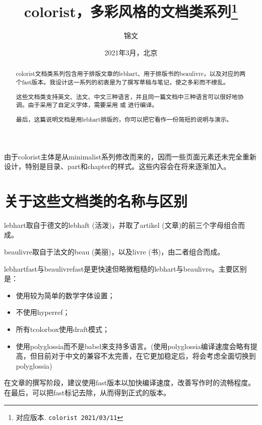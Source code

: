 \documentclass{lebhart}
\providecommand{\colorist}{\textsf{colorist}}
\providecommand{\lebhart}{\textsf{lebhart}}
\providecommand{\lebhartfast}{\textsf{lebhartfast}}
\providecommand{\beaulivre}{\textsf{beaulivre}}
\providecommand{\beaulivrefast}{\textsf{beaulivrefast}}
\begin{document}
\title{\colorist{}，多彩风格的文档类系列\thanks{对应版本. \texttt{\colorist{} 2021/03/11}}}
\author{锦文}
\date{2021年3月，北京}

\maketitle

\begin{abstract}
    \colorist{}文档类系列包含用于排版文章的\lebhart{}、用于排版书的\beaulivre{}，以及对应的两个fast版本。我设计这一系列的初衷是为了撰写草稿与笔记，使之多彩而不缭乱。

    这些文档类支持英文、法文、中文三种语言，并且同一篇文档中三种语言可以很好地协调。由于采用了自定义字体，需要采用  或  进行编译。
    
    最后，这篇说明文档是用\lebhart{}排版的，你可以把它看作一份简短的说明与演示。
\end{abstract}

\begin{tcolorbox}[enhanced jigsaw,pad at break*=1mm,breakable,colback=yellow!25!paper,boxrule=0pt,frame hidden]
    由于\colorist{}主体是从\textsf{minimalist}系列修改而来的，因而一些页面元素还未完全重新设计，特别是目录、part和chapter的样式。这些内容会在将来逐渐加入。
\end{tcolorbox}

\tableofcontents

\section{关于这些文档类的名称与区别}
\lebhart{}取自于德文的lebhaft (活泼)，并取了artikel (文章)的前三个字母组合而成。

\beaulivre{}取自于法文的beau (美丽)，以及livre (书)，由二者组合而成。

\lebhartfast{}与\beaulivrefast{}是更快速但略微粗糙的\lebhart{}与\beaulivre{}。主要区别是：
\begin{itemize}
    \item 使用较为简单的数学字体设置；
    \item 不使用hyperref；
    \item 所有tcolorbox使用draft模式；
    \item 使用polyglossia而不是babel来支持多语言。(使用polyglossia编译速度会略有提高，但目前对于中文的兼容不太完善，在它更加稳定后，将会考虑全面切换到polyglossia)
\end{itemize}

在文章的撰写阶段，建议使用fast版本以加快编译速度，改善写作时的流畅程度。在最后，可以把fast标记去除，从而得到正式的版本。
\end{document}

